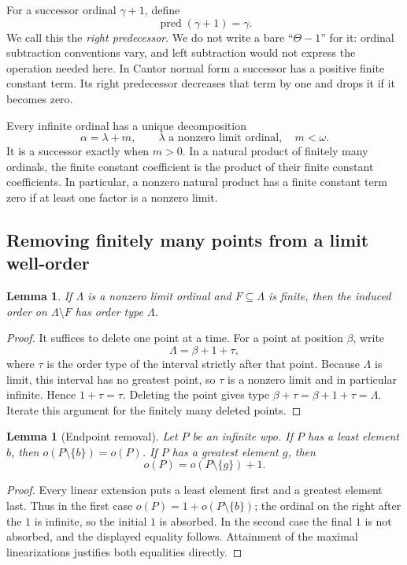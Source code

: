 \documentclass[11pt,letterpaper]{article}
\newtheorem{lemma}[theorem]{Lemma}
\theoremstyle{definition}
\theoremstyle{remark}
\newcommand{\pred}{\operatorname{pred}}
\begin{document}
For a successor ordinal $\gamma+1$, define
\[
 \pred(\gamma+1)=\gamma.
\]
We call this the \emph{right predecessor}. We do not write a bare
``$\Theta-1$'' for it: ordinal subtraction conventions vary, and left
subtraction would not express the operation needed here. In Cantor normal
form a successor has a positive finite constant term. Its right
predecessor decreases that term by one and drops it if it becomes zero.

Every infinite ordinal has a unique decomposition
\begin{equation}\label{eq:finite-tail}
 \alpha=\lambda+m,
 \qquad \lambda\text{ a nonzero limit ordinal},\quad m<\omega.
\end{equation}
It is a successor exactly when $m>0$. In a natural product of finitely many
ordinals, the finite constant coefficient is the product of their finite
constant coefficients. In particular, a nonzero natural product has a
finite constant term zero if at least one factor is a nonzero limit.

\subsection{Removing finitely many points from a limit well-order}

\begin{lemma}\label{lem:finite-removal-ordinal}
If $\Lambda$ is a nonzero limit ordinal and $F\subseteq\Lambda$ is finite,
then the induced order on $\Lambda\setminus F$ has order type $\Lambda$.
\end{lemma}
\begin{proof}
It suffices to delete one point at a time. For a point at position $\beta$,
write
\[
 \Lambda=\beta+1+\tau,
\]
where $\tau$ is the order type of the interval strictly after that point.
Because $\Lambda$ is limit, this interval has no greatest point, so $\tau$
is a nonzero limit and in particular infinite. Hence $1+\tau=\tau$.
Deleting the point gives type $\beta+\tau=\beta+1+\tau=\Lambda$.
Iterate this argument for the finitely many deleted points.
\end{proof}

\begin{lemma}[Endpoint removal]\label{lem:endpoint-removal}
Let $P$ be an infinite wpo.
If $P$ has a least element $b$, then $o(P\setminus\{b\})=o(P)$.
If $P$ has a greatest element $g$, then
\[
 o(P)=o(P\setminus\{g\})+1.
\]
\end{lemma}
\begin{proof}
Every linear extension puts a least element first and a greatest element
last. Thus in the first case
$o(P)=1+o(P\setminus\{b\})$; the ordinal on the right after the $1$ is
infinite, so the initial $1$ is absorbed. In the second case the final $1$
is not absorbed, and the displayed equality follows. Attainment of the
maximal linearizations justifies both equalities directly.
\end{proof}
\end{document}
